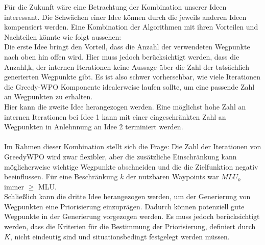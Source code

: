 \documentclass[sigconf,noacm,review]{acmart}
\begin{document}
Für die Zukunft wäre eine Betrachtung der Kombination unserer Ideen interessant. Die Schwächen einer Idee können durch die jeweils anderen Ideen kompensiert werden. Eine Kombination der Algorithmen mit ihren Vorteilen und Nachteilen könnte wie folgt aussehen:\\
Die erste Idee bringt den Vorteil, dass die Anzahl der verwendeten Wegpunkte nach oben hin offen wird. Hier muss jedoch berücksichtigt werden, dass die Anzahl,k, der internen Iterationen keine Aussage über die Zahl der tatsächlich generierten Wegpunkte gibt.  Es ist also schwer vorhersehbar, wie viele Iterationen die Greedy-WPO Komponente idealerweise laufen sollte, um eine passende Zahl an Wegpunkten zu erhalten. \\
Hier kann die zweite Idee herangezogen werden. Eine möglichst hohe Zahl an internen Iterationen bei Idee 1 kann mit einer eingeschränkten Zahl an Wegpunkten in Anlehnnung an Idee 2 terminiert werden.\\
\\
Im Rahmen dieser Kombination stellt sich die Frage: Die Zahl der Iterationen von GreedyWPO wird zwar flexibler, aber die zusätzliche Einschränkung kann möglicherweise wichtige Wegpunkte abschneiden und die die Zielfunktion negativ beeinflussen. Für eine Beschränkung $k$ der nutzbaren Waypoints war $MLU_{k}$ immer $\geq$ MLU. \\

Schließlich kann die dritte Idee herangezogen werden, um der Generierung von Wegpunkten eine Priorisierung einzuprägen. Dadurch können potenziell gute Wegpunkte in der Generierung vorgezogen werden. Es muss jedoch berücksichtigt werden, dass die Kriterien für die Bestimmung der Priorisierung, definiert durch $K$, nicht eindeutig sind und situationsbedingt festgelegt werden müssen.
\end{document}
